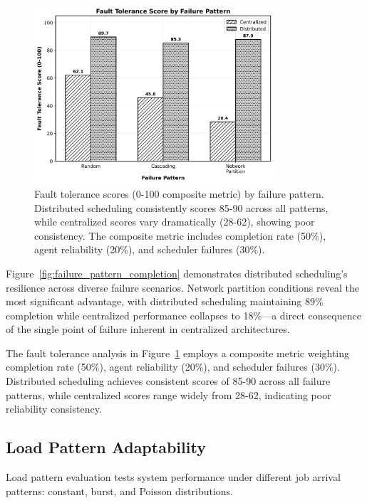 \documentclass[conference]{IEEEtran}
\begin{document}
\begin{figure}[!t]
\centering
\includegraphics[width=3.5in]{figure6_failure_pattern_fault_score.png}
\caption{Fault tolerance scores (0-100 composite metric) by failure pattern. Distributed scheduling consistently scores 85-90 across all patterns, while centralized scores vary dramatically (28-62), showing poor consistency. The composite metric includes completion rate (50\%), agent reliability (20\%), and scheduler failures (30\%).}
\label{fig:failure_pattern_fault_score}
\end{figure}

Figure~\ref{fig:failure_pattern_completion} demonstrates distributed scheduling's resilience across diverse failure scenarios. Network partition conditions reveal the most significant advantage, with distributed scheduling maintaining 89\% completion while centralized performance collapses to 18\%—a direct consequence of the single point of failure inherent in centralized architectures.

The fault tolerance analysis in Figure~\ref{fig:failure_pattern_fault_score} employs a composite metric weighting completion rate (50\%), agent reliability (20\%), and scheduler failures (30\%). Distributed scheduling achieves consistent scores of 85-90 across all failure patterns, while centralized scores range widely from 28-62, indicating poor reliability consistency.

\subsection{Load Pattern Adaptability}

Load pattern evaluation tests system performance under different job arrival patterns: constant, burst, and Poisson distributions.
\end{document}
